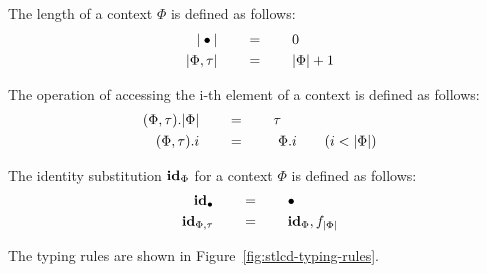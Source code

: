 \documentclass[10pt]{article}
\begin{document}
\begin{mydef}\label{def:stlcd-ctx-len}
The length of a context $\Phi$ is defined as follows:
\begin{align*}
|\bullet| & \qquad = \qquad 0\\
|\Phi,\tau| & \qquad = \qquad |\Phi|+1
\end{align*}
\end{mydef}

\begin{mydef}\label{def:stlcd-ctx-access}
The operation of accessing the i-th element of a context is
defined as follows:
\begin{align*}
(\Phi,\tau).|\Phi| & \qquad = \qquad \tau  \\
(\Phi,\tau).i  & \qquad = \qquad \ \Phi.i \qquad  (i < |\Phi|)
\end{align*}
\end{mydef}


\begin{mydef}\label{def:stlcd-id-subst}
The identity substitution $\mbox{\bf id}_{\Phi}$ for a context $\Phi$ is
defined as follows:
\begin{align*}
  \mbox{\bf id}_{\bullet}    & \qquad = \qquad \bullet\\
  \mbox{\bf id}_{\Phi,\tau}  & \qquad = \qquad \mbox{\bf id}_{\Phi},f_{|\Phi|}
\end{align*}
\end{mydef}

\begin{mydef}[Typing]\label{def:stlcd-typing-rules}
  The typing rules are shown in Figure~\ref{fig:stlcd-typing-rules}.
\end{mydef}
\end{document}
